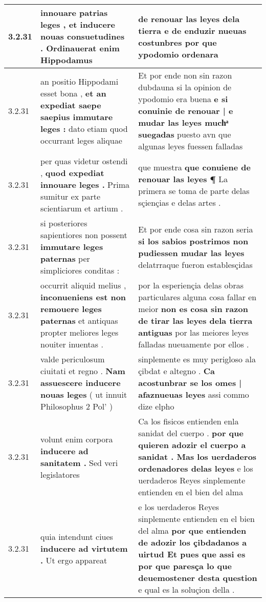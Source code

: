 \begin{tabular}{|p{1cm}|p{6.5cm}|p{6.5cm}|}
3.2.31 & innouare patrias leges , \textbf{ et inducere nouas consuetudines . } Ordinauerat enim Hippodamus & de renouar las leyes dela tierra \textbf{ e de enduzir nueuas costunbres } por que ypodomio ordenara \\\hline
3.2.31 & an positio Hippodami esset bona , \textbf{ et an expediat saepe saepius immutare leges : } dato etiam quod occurrant leges aliquae & Et por ende non sin razon dubdauna si la opinion de ypodomio era buena \textbf{ e si conuinie de renouar | e mudar las leyes muchͣ suegadas } puesto avn que algunas leyes fuessen falladas \\\hline
3.2.31 & per quas videtur ostendi , \textbf{ quod expediat innouare leges . } Prima sumitur ex parte scientiarum et artium . & que muestra \textbf{ que conuiene de renouar las leyes ¶ } La primera se toma de parte delas sçiençias e delas artes . \\\hline
3.2.31 & si posteriores sapientiores non possent \textbf{ immutare leges paternas } per simpliciores conditas : & Et por ende cosa sin razon seria \textbf{ si los sabios postrimos non pudiessen mudar las leyes } delatrraque fueron establesçidas \\\hline
3.2.31 & occurrit aliquid melius , \textbf{ inconueniens est non remouere leges paternas } et antiquas propter meliores leges nouiter inuentas . & por la esperiençia delas obras particulares alguna cosa fallar en meior \textbf{ non es cosa sin razon de tirar las leyes dela tierra antiguas } por las meiores leyes falladas nueuamente por ellos . \\\hline
3.2.31 & valde periculosum ciuitati et regno . \textbf{ Nam assuescere inducere nouas leges } ( ut innuit Philosophus 2 Pol’ ) & sinplemente es muy perigloso ala çibdat e altegno . \textbf{ Ca acostunbrar se los omes | afaznueuas leyes } assi commo dize elpho \\\hline
3.2.31 & volunt enim corpora \textbf{ inducere ad sanitatem . } Sed veri legislatores & Ca los fisicos entienden enla sanidat del cuerpo . \textbf{ por que quieren adozir el cuerpo a sanidat . Mas los uerdaderos ordenadores delas leyes } e los uerdaderos Reyes sinplemente entienden en el bien del alma \\\hline
3.2.31 & quia intendunt ciues \textbf{ inducere ad virtutem . } Ut ergo appareat & e los uerdaderos Reyes sinplemente entienden en el bien del alma \textbf{ por que entienden de adozir los çibdadanos a uirtud Et pues que assi es por que paresça lo que deuemostener desta question } e qual es la soluçion della . \\\hline

\end{tabular}
